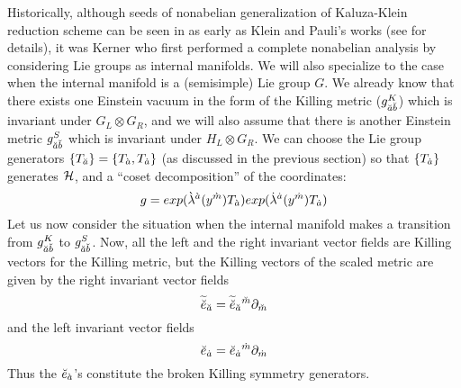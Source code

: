 \documentclass[a4paper,12pt]{article}
\begin{document}
Historically, although seeds of nonabelian generalization of Kaluza-Klein reduction scheme can be seen in as early as Klein and Pauli's works (see \cite{dawn,kaluza} for details), it was Kerner \cite{kerner} who first performed a complete nonabelian analysis by considering  Lie groups as internal manifolds. We will also specialize to the case when the internal manifold is a (semisimple) Lie group $G$. We already  know that there exists one Einstein vacuum in the form of the Killing metric ($g^K_{\breve{a}\breve{b}}$) which is invariant under $G_L\otimes G_R$, and we will also assume that there is another Einstein metric $g^S_{\breve{a}\breve{b}}$ which is  invariant under $H_L\otimes G_R$. We can choose the Lie group generators $\{T_{\breve{a}}\}=\{T_{\grave{a}},T_{\dot{a}}\}$ (as discussed in the previous section) so that $\{T_{\dot{a}}\}$ generates $\cal{H}$, and a ``coset decomposition'' of the coordinates:
$$g=exp(\grave{\lambda}^{\grave{a}}(y^{\grave{m}})T_{\grave{a}}) exp(\dot{\lambda}^{\dot{a}}(y^{\dot{m}})T_{\dot{a}})$$
Let us now consider the situation when the internal manifold makes a transition from $g^K_{\breve{a}\breve{b}}$ to $g^S_{\breve{a}\breve{b}}$. Now, all the left and the right invariant vector fields are  Killing vectors for the Killing metric, but the Killing vectors of the scaled metric are given by the right invariant vector fields 
$$\widetilde{\breve{e}}_{\breve{a}}=\widetilde{\breve{e}}_{\breve{a}}{}^{\breve{m}}\partial_{\breve{m}}$$
and the left invariant vector fields 
\begin{equation}
\breve{e}_{\dot{a}}=\breve{e}_{\dot{a}}{}^{\dot{m}}\partial_{\dot{m}}
\end{equation}
Thus the $\breve{e}_{\grave{a}}$'s constitute the broken Killing symmetry generators.
 \vspace{5mm}
\\ 
\end{document}
